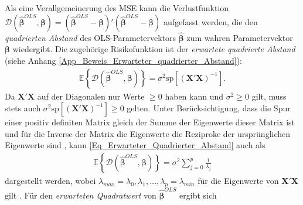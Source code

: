 \documentclass[12pt, a4paper]{report}\usepackage[]{graphicx}\usepackage[]{color}
\begin{document}
Als eine Verallgemeinerung des MSE kann die Verlustfunktion $\mathcal{D}(\boldsymbol{\hat{\beta}}^{OLS},\boldsymbol{\beta}) = (\boldsymbol{\hat{\beta}}^{OLS} - \boldsymbol{\beta} )'(\boldsymbol{\hat{\beta}}^{OLS}-\boldsymbol{\beta})$ aufgefasst werden, die den \textit{quadrierten Abstand} des OLS-Parametervektors $\boldsymbol{\hat{\beta}}$ zum wahren Parametervektor $\boldsymbol{\beta}$ wiedergibt. Die zugehörige Risikofunktion ist der \textit{erwartete quadrierte Abstand} (siehe Anhang \ref{App_Beweis_Erwarteter_quadrierter_Abstand}):
\begin{align}\label{Eq_Erwarteter_Quadrierter_Abstand}
\mathbb{E} \left\lbrace \mathcal{D}(\boldsymbol{\hat{\beta}}^{OLS},\boldsymbol{\beta}) \right\rbrace=\sigma^2 \text{sp}[(\mathbf{X}'\mathbf{X})^{-1}].
\end{align}
Da $\mathbf{X}'\mathbf{X}$ auf der Diagonalen nur Werte $\geq 0$ haben kann und $\sigma^2 \geq 0$ gilt, muss stets auch $\sigma^2 \text{sp}[(\mathbf{X}'\mathbf{X})^{-1}] \geq 0$ gelten. Unter Berücksichtigung, dass die Spur einer positiv definiten Matrix gleich der Summe der Eigenwerte dieser Matrix ist und für die Inverse der Matrix die Eigenwerte die Reziproke der ursprünglichen Eigenwerte sind \cite{strang09ointro_linalg}, kann \eqref{Eq_Erwarteter_Quadrierter_Abstand} auch als \begin{align}\label{Eq_Lambda_Laenge_OLS}
\mathbb{E} \left\lbrace \mathcal{D}(\boldsymbol{\hat{\beta}}^{OLS},\boldsymbol{\beta}) \right\rbrace=\sigma^2 \sum_{j=0}^{p} \frac{1}{\lambda_j}
\end{align}
dargestellt werden, wobei $\lambda_{max}=\lambda_{0},\lambda_{1},\dots,\lambda_p=\lambda_{min}$ für die Eigenwerte von $\mathbf{X}'\mathbf{X}$ gilt \cite{hoerl_ridge_1970}.
Für den \textit{erwarteten Quadratwert} von $\boldsymbol{\hat{\beta}}^{OLS}$ ergibt sich
\end{document}
